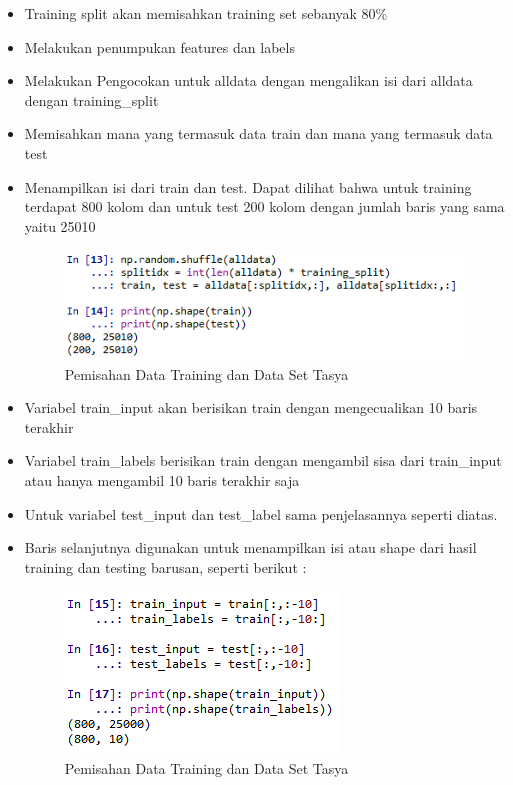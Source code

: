 \begin{itemize}
\item Training split akan memisahkan training set sebanyak 80\%
\item Melakukan penumpukan features dan labels
\item Melakukan Pengocokan untuk alldata dengan mengalikan isi dari alldata dengan training\_split
\item Memisahkan mana yang termasuk data train dan mana yang termasuk data test
\item Menampilkan isi dari train dan test. Dapat dilihat bahwa untuk training terdapat 800 kolom dan untuk test 200 kolom dengan jumlah baris yang sama yaitu 25010
\begin{figure}[ht]
\centering
\includegraphics[scale=0.5]{figures/chapter6tasya15.png}
\caption{Pemisahan Data Training dan Data Set Tasya}
\label{Praktek}
\end{figure}
\item Variabel train\_input akan berisikan train dengan mengecualikan 10 baris terakhir
\item Variabel train\_labels berisikan train dengan mengambil sisa dari train\_input atau hanya mengambil 10 baris terakhir saja
\item Untuk variabel test\_input dan test\_label sama penjelasannya seperti diatas.
\item Baris selanjutnya digunakan untuk menampilkan isi atau shape dari hasil training dan testing barusan, seperti berikut :
\begin{figure}[ht]
\centering
\includegraphics[scale=0.5]{figures/chapter6tasya16.png}
\caption{Pemisahan Data Training dan Data Set Tasya}
\label{Praktek}
\end{figure}
\end{itemize}

